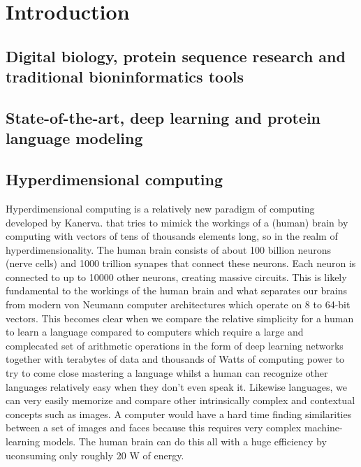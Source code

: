 \chapter[Introduction]%
{Introduction}

\section{Digital biology, protein sequence research and traditional bioninformatics tools}

\section{State-of-the-art, deep learning and protein language modeling}

\section{Hyperdimensional computing}
Hyperdimensional computing is a relatively new paradigm of computing developed by Kanerva.\cite{Kanerva2009} that tries to mimick the workings of a (human) brain by computing with vectors of tens of thousands elements long, so in the realm of hyperdimensionality. The human brain consists of about 100 billion neurons (nerve cells) and 1000 trillion synapes that connect these neurons. Each neuron is connected to up to 10000 other neurons, creating massive circuits. This is likely fundamental to the workings of the human brain and what separates our brains from modern von Neumann computer architectures which operate on 8 to 64-bit vectors. This becomes clear when we compare the relative simplicity for a human to learn a language compared to computers which require a large and complecated set of arithmetic operations in the form of deep learning networks together with terabytes of data and thousands of Watts of computing power to try to come close mastering a language whilst a human can recognize other languages relatively easy when they don't even speak it. Likewise languages, we can very easily memorize and compare other intrinsically complex and contextual concepts such as images. A computer would have a hard time finding similarities between a set of images and faces because this requires very complex machine-learning models. The human brain can do this all with a huge efficiency by uconsuming only roughly 20 W of energy.

